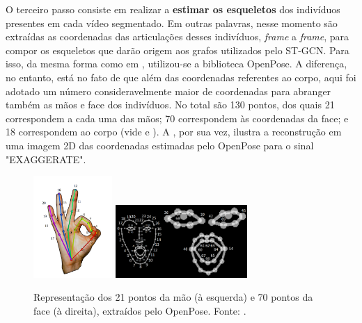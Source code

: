 O terceiro passo consiste em realizar a \textbf{estimar os esqueletos} dos indivíduos presentes em cada vídeo segmentado. Em outras palavras, nesse momento são extraídas as coordenadas das articulações desses indivíduos, \textit{frame} a \textit{frame}, para compor os esqueletos que darão origem aos grafos utilizados pelo ST-GCN. Para isso, da mesma forma como em \cite{st-gcn-2018}, utilizou-se a biblioteca OpenPose. A diferença, no entanto, está no fato de que além das coordenadas referentes ao corpo, aqui foi adotado um número consideravelmente maior de coordenadas para abranger também as mãos e face dos indivíduos. No total são 130 pontos, dos quais 21 correspondem a cada uma das mãos; 70 correspondem às coordenadas da face; e 18 correspondem ao corpo (vide  e ). A , por sua vez, ilustra a reconstrução em uma imagem 2D das coordenadas estimadas pelo OpenPose para o sinal "EXAGGERATE".


\begin{figure}[ht]
    \centering
    \includegraphics[width=3cm]{images/keypoints_hand}
    \includegraphics[width=5cm]{images/keypoints_face}
    \caption{Representação dos 21 pontos da mão (à esquerda) e 70 pontos da face (à direita), extraídos pelo OpenPose. Fonte: \cite{openpose-output-2018}.}
    \label{fig:keypoints-face-hand}
\end{figure}

